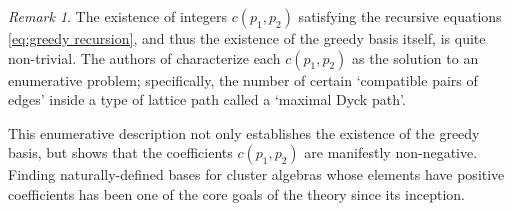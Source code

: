 \documentclass[11pt]{amsart}
\theoremstyle{remark}
\newtheorem{remark}[theorem]{Remark}
\numberwithin{equation}{section}
\begin{document}
\begin{remark}\label{rem:Dyck}
The existence of integers $c(p_1,p_2)$ satisfying the recursive equations \eqref{eq:greedy recursion}, and thus the existence of the greedy basis itself, is quite non-trivial.  The authors of \cite{LLZ} characterize each $c(p_1,p_2)$ as the solution to an enumerative problem; specifically, the number of certain `compatible pairs of edges' inside a type of lattice path called a `maximal Dyck path'.

This enumerative description not only establishes the existence of the greedy basis, but shows that the coefficients $c(p_1,p_2)$ are manifestly non-negative.  Finding naturally-defined bases for cluster algebras whose elements have positive coefficients has been one of the core goals of the theory since its inception.  %
\end{remark}

\end{document}
